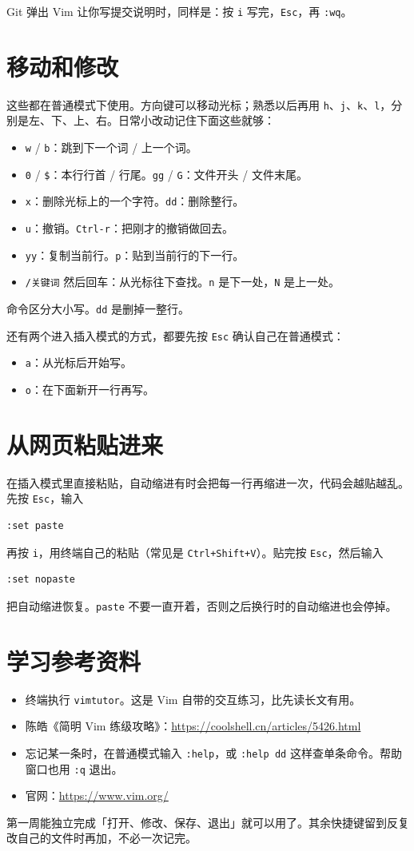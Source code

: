 Git 弹出 Vim 让你写提交说明时，同样是：按 \verb|i| 写完，\verb|Esc|，再 \verb|:wq|。

\section{移动和修改}
这些都在普通模式下使用。方向键可以移动光标；熟悉以后再用 \verb|h|、\verb|j|、\verb|k|、\verb|l|，分别是左、下、上、右。日常小改动记住下面这些就够：

\begin{itemize}
\item \verb|w| / \verb|b|：跳到下一个词 / 上一个词。
\item \verb|0| / \verb|$|：本行行首 / 行尾。\verb|gg| / \verb|G|：文件开头 / 文件末尾。
\item \verb|x|：删除光标上的一个字符。\verb|dd|：删除整行。
\item \verb|u|：撤销。\verb|Ctrl-r|：把刚才的撤销做回去。
\item \verb|yy|：复制当前行。\verb|p|：贴到当前行的下一行。
\item \verb|/关键词| 然后回车：从光标往下查找。\verb|n| 是下一处，\verb|N| 是上一处。
\end{itemize}
命令区分大小写。\verb|dd| 是删掉一整行。

还有两个进入插入模式的方式，都要先按 \verb|Esc| 确认自己在普通模式：
\begin{itemize}
\item \verb|a|：从光标后开始写。
\item \verb|o|：在下面新开一行再写。
\end{itemize}

\section{从网页粘贴进来}
在插入模式里直接粘贴，自动缩进有时会把每一行再缩进一次，代码会越贴越乱。先按 \verb|Esc|，输入
\begin{verbatim}
:set paste
\end{verbatim}
再按 \verb|i|，用终端自己的粘贴（常见是 \verb|Ctrl+Shift+V|）。贴完按 \verb|Esc|，然后输入
\begin{verbatim}
:set nopaste
\end{verbatim}
把自动缩进恢复。\verb|paste| 不要一直开着，否则之后换行时的自动缩进也会停掉。

\section{学习参考资料}
\begin{itemize}
\item 终端执行 \verb|vimtutor|。这是 Vim 自带的交互练习，比先读长文有用。
\item 陈皓《简明 Vim 练级攻略》：\url{https://coolshell.cn/articles/5426.html}
\item 忘记某一条时，在普通模式输入 \verb|:help|，或 \verb|:help dd| 这样查单条命令。帮助窗口也用 \verb|:q| 退出。
\item 官网：\url{https://www.vim.org/}
\end{itemize}
第一周能独立完成「打开、修改、保存、退出」就可以用了。其余快捷键留到反复改自己的文件时再加，不必一次记完。



